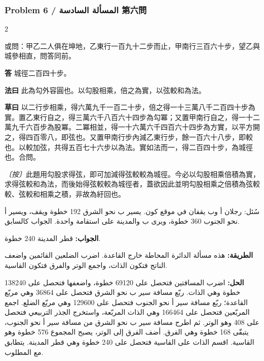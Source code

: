 \documentclass[11pt,a4paper]{article}
\newcommand{\ar}[1]{\arabicfont\beginR #1\endR}
\newcommand{\Answer}[1]{\par\noindent\textbf{\color{problemcolor}答} #1\par}
\newcommand{\Method}[1]{\par\noindent\textbf{\color{problemcolor}法曰} #1\par}
\newcommand{\Workings}[1]{\par\noindent\textbf{\color{problemcolor}草曰} #1\par}
\newcommand{\Remark}[1]{\par\noindent\textit{〔按〕}#1\par}
\newcommand{\AnswerAr}{\par\noindent\textbf{\color{problemcolor}\ar{الجواب:}} }
\newcommand{\MethodAr}{\par\noindent\textbf{\color{problemcolor}\ar{الطريقة:}} }
\newcommand{\WorkingsAr}{\par\noindent\textbf{\color{problemcolor}\ar{الحل:}} }
\begin{document}
\subsubsection*{Problem 6 / \ar{المسألة السادسة} \quad 第六問}

\begin{paracol}{2}

\noindent 或問：甲乙二人俱在坤地，乙東行一百九十二步而止，甲南行三百六十步，望乙與城參相直，問答同前。

\vspace{0.2cm}

\Answer{城徑二百四十步。}

\vspace{0.2cm}

\Method{此為勾外容圓也。以勾股相乘，倍之為實，以弦較和為法。}

\vspace{0.2cm}

\Workings{以二行步相乘，得六萬九千一百二十步，倍之得一十三萬八千二百四十步為實。置乙東行自之，得三萬六千八百六十四步為勾冪；又置甲南行自之，得一十二萬九千六百步為股冪。二冪相並，得一十六萬六千四百六十四步為方實，以平方開之，得四百零八，即弦也。又置甲南行步內減乙東行步，餘一百六十八步，即較也。以較加弦，共得五百七十六步以為法。實如法而一，得二百四十步，為城徑也。合問。}

\vspace{0.2cm}

\Remark{此題用勾股求得弦，即可加減得弦較較為城徑。今必以勾股相乘倍積為實，求得弦較和為法，而後始得弦較較為城徑者，蓋欲因此並明勾股相乘之倍積為弦較較、弦較和相乘之積，非故為紆回也。}

\switchcolumn

\ar{سُئل: رجلان أ وب يقفان في موقع كون. يسير ب نحو الشرق 192 خطوة ويقف، ويسير أ نحو الجنوب 360 خطوة، ويرى ب والمدينة على استقامة واحدة. الجواب كالسابق.}

\vspace{0.2cm}

\AnswerAr{قطر المدينة 240 خطوة.}

\vspace{0.2cm}

\MethodAr{هذه مسألة الدائرة المحاطة خارج القاعدة. اضرب الضلعين القائمين واضعف الناتج فتكون الذات، واجمع الوتر والفرق فتكون القاسية.}

\vspace{0.2cm}

\WorkingsAr{اضرب المسافتين فتحصل على 69120 خطوة، واضعفها فتحصل على 138240 خطوة وهي الذات. ربّع مسافة سير ب نحو الشرق فتحصل على 36864 وهي مربّع القاعدة؛ ربّع مسافة سير أ نحو الجنوب فتحصل على 129600 وهي مربّع الضلع. اجمع المربّعين فتحصل على 166464 وهي الذات المربّعة، واستخرج الجذر التربيعي فتحصل على 408 وهو الوتر. ثم اطرح مسافة سير ب نحو الشرق من مسافة سير أ نحو الجنوب، يتبقّى 168 خطوة وهي الفرق. أضف الفرق إلى الوتر، يصبح المجموع 576 خطوة وهو القاسية. اقسم الذات على القاسية فتحصل على 240 خطوة وهي قطر المدينة. يتطابق مع المطلوب.}


\end{paracol}
\end{document}
